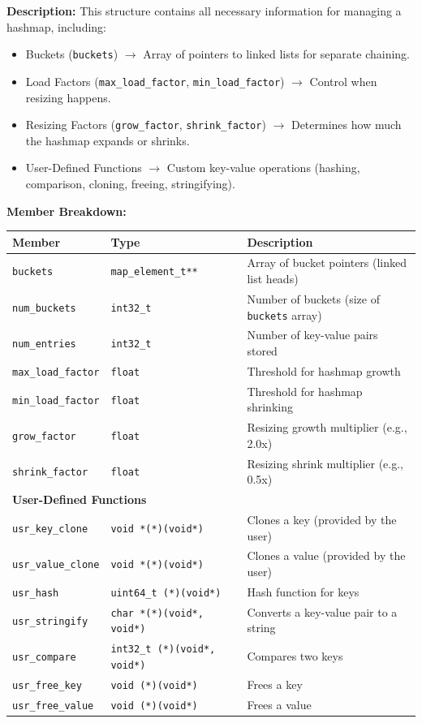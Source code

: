 \documentclass[titlepage]{article}
\begin{document}
\textbf{Description:}
This structure contains all necessary information for managing a hashmap, including:
\begin{itemize}
    \item Buckets (\texttt{buckets}) $\rightarrow$ Array of pointers to linked lists for separate chaining.
    \item Load Factors (\texttt{max\_load\_factor}, \texttt{min\_load\_factor}) $\rightarrow$ Control when resizing happens.
    \item Resizing Factors (\texttt{grow\_factor}, \texttt{shrink\_factor}) $\rightarrow$ Determines how much the hashmap expands or shrinks.
    \item User-Defined Functions $\rightarrow$ Custom key-value operations (hashing, comparison, cloning, freeing, stringifying).
\end{itemize}

\textbf{Member Breakdown:}
\begin{center}
\begin{tabular}{@{} l l l @{} }
\toprule
\textbf{Member} & \textbf{Type} & \textbf{Description} \\
\midrule
\texttt{buckets} & \texttt{map\_element\_t**} & Array of bucket pointers (linked list heads) \\
\texttt{num\_buckets} & \texttt{int32\_t} & Number of buckets (size of \texttt{buckets} array) \\
\texttt{num\_entries} & \texttt{int32\_t} & Number of key-value pairs stored \\
\texttt{max\_load\_factor} & \texttt{float} & Threshold for hashmap growth \\
\texttt{min\_load\_factor} & \texttt{float} & Threshold for hashmap shrinking \\
\texttt{grow\_factor} & \texttt{float} & Resizing growth multiplier (e.g., 2.0x) \\
\texttt{shrink\_factor} & \texttt{float} & Resizing shrink multiplier (e.g., 0.5x) \\
\midrule
\multicolumn{3}{l}{\textbf{User-Defined Functions}} \\
\midrule
\texttt{usr\_key\_clone} & \texttt{void *(*)(void*)} & Clones a key (provided by the user) \\
\texttt{usr\_value\_clone} & \texttt{void *(*)(void*)} & Clones a value (provided by the user) \\
\texttt{usr\_hash} & \texttt{uint64\_t (*)(void*)} & Hash function for keys \\
\texttt{usr\_stringify} & \texttt{char *(*)(void*, void*)} & Converts a key-value pair to a string \\
\texttt{usr\_compare} & \texttt{int32\_t (*)(void*, void*)} & Compares two keys \\
\texttt{usr\_free\_key} & \texttt{void (*)(void*)} & Frees a key \\
\texttt{usr\_free\_value} & \texttt{void (*)(void*)} & Frees a value \\
\bottomrule
\end{tabular}
\end{center}
\end{document}
